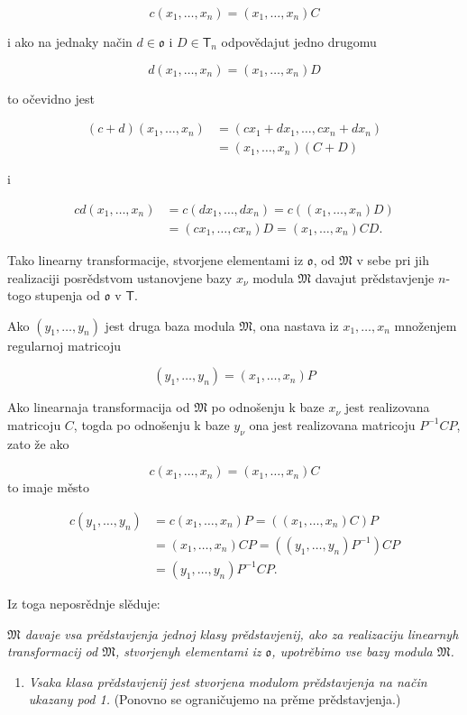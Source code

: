 \documentclass[11pt]{article}
\providecommand{\tightlist}{\setlength{\itemsep}{0pt}\setlength{\parskip}{0pt}}
\begin{document}
\[
c(x_1,\ldots,x_n)=(x_1,\ldots,x_n)C
\]

i ako na jednaky način \(d\in\mathfrak{o}\) i \(D\in\mathsf T_n\) odpovědajut jedno drugomu

\[
d(x_1,\ldots,x_n)=(x_1,\ldots,x_n)D
\]

to očevidno jest

\[
\begin{aligned}
(c+d)(x_1,\ldots,x_n)
&=(cx_1+dx_1,\ldots,cx_n+dx_n)\\
&=(x_1,\ldots,x_n)(C+D)
\end{aligned}
\]

i

\[
\begin{aligned}
cd(x_1,\ldots,x_n)
&=c(dx_1,\ldots,dx_n)=c((x_1,\ldots,x_n)D)\\
&=(cx_1,\ldots,cx_n)D=(x_1,\ldots,x_n)CD.
\end{aligned}
\]

Tako linearny transformacije, stvorjene elementami iz \(\mathfrak{o}\), od \(\mathfrak M\) v sebe pri jih realizaciji posrědstvom ustanovjene bazy \(x_\nu\) modula \(\mathfrak M\) davajut prědstavjenje \(n\)-togo stupenja od \(\mathfrak{o}\) v \(\mathsf T\).

Ako \((y_1,\ldots,y_n)\) jest druga baza modula \(\mathfrak M\), ona nastava iz \(x_1,\ldots,x_n\) množenjem regularnoj matricoju

\[(y_1,\ldots,y_n)=(x_1,\ldots,x_n)P\]

Ako linearnaja transformacija od \(\mathfrak M\) po odnošenju k baze \(x_\nu\) jest realizovana matricoju \(C\), togda po odnošenju k baze \(y_\nu\) ona jest realizovana matricoju \(P^{-1}CP\), zato že ako

\[c(x_1,\ldots,x_n)=(x_1,\ldots,x_n)C\]
to imaje město

\[
\begin{aligned}
c(y_1,\ldots,y_n)
&=c(x_1,\ldots,x_n)P=((x_1,\ldots,x_n)C)P\\
&=(x_1,\ldots,x_n)CP=((y_1,\ldots,y_n)P^{-1})CP\\
&=(y_1,\ldots,y_n)P^{-1}CP.
\end{aligned}
\]

Iz toga neposrědnje slěduje:

\emph{\(\mathfrak M\) davaje vsa prědstavjenja jednoj klasy prědstavjenij, ako za realizaciju linearnyh transformacij od \(\mathfrak M\), stvorjenyh elementami iz \(\mathfrak{o}\), upotrěbimo vse bazy modula \(\mathfrak M\).}

\begin{enumerate}
\def\labelenumi{\arabic{enumi}.}
\setcounter{enumi}{1}
\tightlist
\item
  \emph{Vsaka klasa prědstavjenij jest stvorjena modulom prědstavjenja na način ukazany pod 1.} (Ponovno se ograničujemo na prěme prědstavjenja.)
\end{enumerate}
\end{document}
